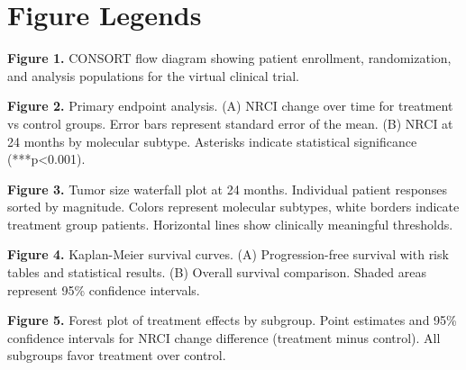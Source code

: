 \documentclass[12pt,a4paper]{article}
\begin{document}
\newpage

\section*{Figure Legends}

\textbf{Figure 1.} CONSORT flow diagram showing patient enrollment, randomization, and analysis populations for the virtual clinical trial.

\textbf{Figure 2.} Primary endpoint analysis. (A) NRCI change over time for treatment vs control groups. Error bars represent standard error of the mean. (B) NRCI at 24 months by molecular subtype. Asterisks indicate statistical significance (***p<0.001).

\textbf{Figure 3.} Tumor size waterfall plot at 24 months. Individual patient responses sorted by magnitude. Colors represent molecular subtypes, white borders indicate treatment group patients. Horizontal lines show clinically meaningful thresholds.

\textbf{Figure 4.} Kaplan-Meier survival curves. (A) Progression-free survival with risk tables and statistical results. (B) Overall survival comparison. Shaded areas represent 95\% confidence intervals.

\textbf{Figure 5.} Forest plot of treatment effects by subgroup. Point estimates and 95\% confidence intervals for NRCI change difference (treatment minus control). All subgroups favor treatment over control.
\end{document}
